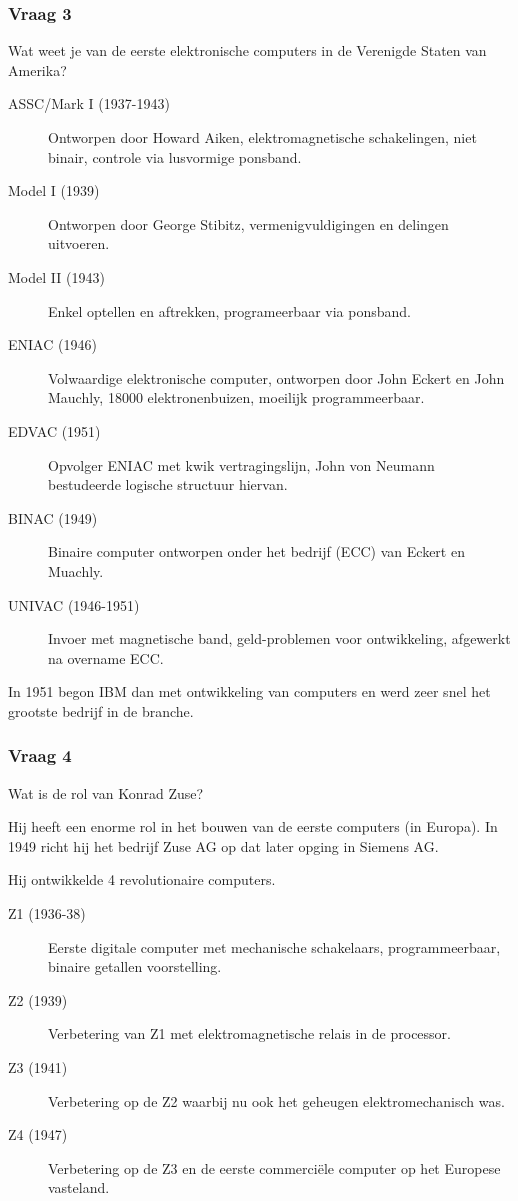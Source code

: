 \documentclass[../main.tex]{subfiles}
\begin{document}
\subsubsection{Vraag 3}
\begin{question} Wat weet je van de eerste elektronische computers in de Verenigde Staten van Amerika?  \end{question}

\begin{solution}
		\begin{description}
				\item[ASSC/Mark I (1937-1943)]
						Ontworpen door Howard Aiken, elektromagnetische schakelingen, niet binair, controle via lusvormige ponsband.
				\item[Model I (1939)] Ontworpen door George Stibitz, vermenigvuldigingen en delingen uitvoeren.
				\item[Model II (1943)] Enkel optellen en aftrekken, programeerbaar via ponsband. 
				\item[ENIAC (1946)] Volwaardige elektronische computer, ontworpen door John Eckert en John Mauchly, 18000 elektronenbuizen, moeilijk programmeerbaar.
				\item[EDVAC (1951)] Opvolger ENIAC met kwik vertragingslijn, John von Neumann bestudeerde logische structuur hiervan.
				\item[BINAC (1949)] Binaire computer ontworpen onder het bedrijf (ECC) van Eckert en Muachly.
				\item[UNIVAC (1946-1951)] Invoer met magnetische band, geld-problemen voor ontwikkeling, afgewerkt na overname ECC.
		\end{description}
		In 1951 begon IBM dan met ontwikkeling van computers en werd zeer snel het grootste bedrijf in de branche.
\end{solution}
\subsubsection{Vraag 4}
\begin{question}
Wat is de rol van Konrad Zuse?
\end{question}

\begin{solution}
Hij heeft een enorme rol in het bouwen van de eerste computers (in Europa).
In 1949 richt hij het bedrijf Zuse AG op dat later opging in Siemens AG.

Hij ontwikkelde 4 revolutionaire computers.
\begin{description}
		\item[Z1 (1936-38)] Eerste digitale computer met mechanische schakelaars, programmeerbaar, binaire getallen voorstelling.
		\item[Z2 (1939)] Verbetering van Z1 met elektromagnetische relais in de processor.
		\item[Z3 (1941)] Verbetering op de Z2 waarbij nu ook het geheugen elektromechanisch was.
		\item[Z4 (1947)] Verbetering op de Z3 en de eerste commerci\"ele computer op het Europese vasteland.
\end{description}
\end{solution}
\end{document}

